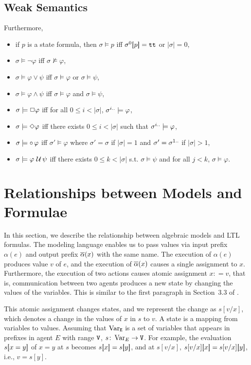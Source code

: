\documentclass[12pt,a4paper,titlepage]{article}
\theoremstyle{break}
\begin{document}
\subsection{Weak Semantics}
Furthermore,
  \begin{itemize}
\item if $p$ is a state formula, then \(\sigma\models p\) iff \(\sigma^0\lsquarebracket p\rsquarebracket=\true\) or \(|\sigma|=0\),
\item \(\sigma\models\neg\varphi\) iff \(\sigma\not\models\varphi\),
\item \(\sigma\models\varphi\vee\psi\) iff \(\sigma\models\varphi\) or \(\sigma\models\psi\),
\item \(\sigma\models\varphi\wedge\psi\) iff \(\sigma\models\varphi\) and \(\sigma\models\psi\),
\item \(\sigma\models\ltlbox\varphi\) iff for all \(0\leq i<|\sigma|\), \(\suffix{\sigma}{i}\models\varphi\),
\item \(\sigma\models\ltldiammond\varphi\) iff there exists \(0\leq i<|\sigma|\) such that \(\suffix{\sigma}{i}\models\varphi\),
\item \(\sigma\models\ltlnext\varphi\) iff \(\sigma'\models\varphi\) where \(\sigma'=\sigma\) if \(|\sigma|=1\) and \(\sigma'=\suffix{\sigma}{1}\) if \(|\sigma|>1\),
\item \(\sigma\models\varphi\ltluntil\psi\) iff there exists \(0\leq k<|\sigma|\) s.t. \(\sigma\models\psi\) and for all \(j<k\), \(\sigma\models\varphi\).
  \end{itemize}
%
%
\section{Relationships between Models and Formulae}
In this section, we describe the relationship between algebraic models and LTL formulas.
The modeling language enables us to pass values via input prefix \(\alpha(e)\) and output prefix \(\bijection{\alpha}(x)\) with the same name.
The execution of \(\alpha(e)\) produces  value \(v\) of \(e\), and  the execution of \(\bijection{\alpha}(x)\) causes a single assignment to \(x\).
Furthermore, the execution of two actions causes atomic assignment \(x \colon = v\), that is, communication between two agents produces a new state by changing the values of the variables.
This is similar to the first paragraph in Section~3.3 of \cite[page 290]{lamport84hoare}.

This atomic assignment changes states, and  we represent the change as \(s[v/x]\), which denotes a change in the values of \(x\) in \(s\) to \(v\).
A state is a mapping from variables to values.
Assuming that \(\tt \Var_E\) is a set of variables that appears in prefixes in agent \(E\) with range \(\tt V\), \(s\colon \Var_E\rightarrow {\tt V}\).
For example, the evaluation \(s\lsquarebracket x=y\rsquarebracket\) of \(x=y\) at \(s\) becomes \(s\lsquarebracket x\rsquarebracket=s\lsquarebracket y\rsquarebracket\), and at \(s[v/x]\), \(s[v/x]\lsquarebracket x\rsquarebracket=s[v/x]\lsquarebracket y\rsquarebracket\), i.e., \(v=s[y]\).
\end{document}

